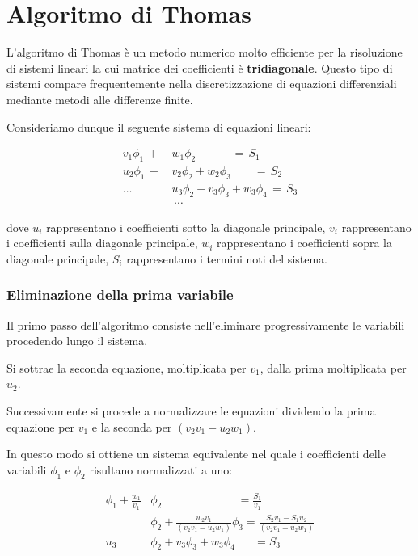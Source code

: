 \chapter{Algoritmo di Thomas}

L'algoritmo di Thomas è un metodo numerico molto efficiente per la risoluzione di sistemi lineari la cui matrice dei coefficienti è \textbf{tridiagonale}. Questo tipo di sistemi compare frequentemente nella discretizzazione di equazioni differenziali mediante metodi alle differenze finite.

Consideriamo dunque il seguente sistema di equazioni lineari:

\[\begin{aligned}
	v_1 \phi_1\, +\, &w_1 \phi_2\, \quad \quad \quad =\, S_1 \\
	u_2 \phi_1\, +\, &v_2 \phi_2 + w_2 \phi_3 \quad \quad =\, S_2 \\
	\dots \ \ &u_3 \phi_2 + v_3 \phi_3 + w_3 \phi_4\, =\, S_3 \\
	&\ \cdots
\end{aligned}\]

dove $u_i$ rappresentano i coefficienti sotto la diagonale principale, $v_i$ rappresentano i coefficienti sulla diagonale principale, $w_i$ rappresentano i coefficienti sopra la diagonale principale, $S_i$ rappresentano i termini noti del sistema.

\subsection*{Eliminazione della prima variabile}

Il primo passo dell'algoritmo consiste nell'eliminare progressivamente le variabili procedendo lungo il sistema.

Si sottrae la seconda equazione, moltiplicata per $v_1$, dalla prima moltiplicata per $u_2$.

Successivamente si procede a normalizzare le equazioni dividendo la prima equazione per $v_1$ e la seconda per $(v_2 v_1 - u_2 w_1)$.

In questo modo si ottiene un sistema equivalente nel quale i coefficienti delle variabili $\phi_1$ e $\phi_2$ risultano normalizzati a uno:

\[ \begin{aligned}
	\phi_1 + \frac{w_1}{v_1}&\phi_2 \qquad \qquad \qquad\ \ \ =  \frac{S_1}{v_1} \\
	&\phi_2 + \frac{w_2 v_1}{(v_2 v_1 - u_2 w_1)} \phi_3
	=
	\frac{S_2 v_1 - S_1 u_2}{(v_2 v_1 - u_2 w_1)}\\
	u_3 &\phi_2 + v_3 \phi_3 + w_3 \phi_4 \quad\ \ \ = S_3
\end{aligned} \]

